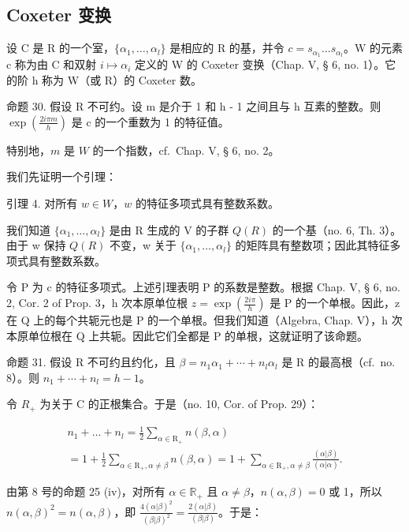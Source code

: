 \subsection{Coxeter 变换}

设 C 是 R 的一个室，\(\{\alpha_{1},\ldots,\alpha_{l}\}\) 是相应的 R 的基，并令 \(c=s_{\alpha_{1}}\ldots s_{\alpha_{l}}\)。W 的元素 c 称为由 C 和双射 \(i\mapsto\alpha_{i}\) 定义的 W 的 Coxeter 变换（Chap. V, § 6, no. 1）。它的阶 h 称为 W（或 R）的 Coxeter 数。

命题 30. 假设 R 不可约。设 m 是介于 1 和 h - 1 之间且与 h 互素的整数。则 \(\exp\left(\frac{2i\pi m}{h}\right)\) 是 c 的一个重数为 1 的特征值。

特别地，\(m\) 是 \(W\) 的一个指数，cf.~Chap. V, § 6, no. 2。

我们先证明一个引理：

引理 4. 对所有 \(w \in W\)，\(w\) 的特征多项式具有整数系数。

我们知道 \(\{\alpha_{1},\ldots,\alpha_{l}\}\) 是由 R 生成的 V 的子群 \(Q(R)\) 的一个基（no. 6, Th. 3）。由于 w 保持 \(Q(R)\) 不变，w 关于 \(\{\alpha_{1},\ldots,\alpha_{l}\}\) 的矩阵具有整数项；因此其特征多项式具有整数系数。

令 P 为 c 的特征多项式。上述引理表明 P 的系数是整数。根据 Chap. V, § 6, no. 2, Cor. 2 of Prop. 3，h 次本原单位根 \(z = \exp\left(\frac{2i\pi}{h}\right)\) 是 P 的一个单根。因此，z 在 Q 上的每个共轭元也是 P 的一个单根。但我们知道（Algebra, Chap. V），h 次本原单位根在 Q 上共轭。因此它们全都是 P 的单根，这就证明了该命题。

命题 31. 假设 R 不可约且约化，且 \(\beta = n_{1}\alpha_{1} + \cdots + n_{l}\alpha_{l}\) 是 R 的最高根（cf.~no. 8）。则 \(n_{1} + \cdots + n_{l} = h - 1\)。

令 \(R_{+}\) 为关于 C 的正根集合。于是（no. 10, Cor. of Prop. 29）：

\[
\begin{array}{l} n _ {1} + \dots + n _ {l} = \frac {1}{2} \sum_ {\alpha \in \mathrm{R} _ {+}} n (\beta , \alpha) \\ = 1 + \frac {1}{2} \sum_ {\alpha \in \mathrm{R} _ {+}, \alpha \neq \beta} n (\beta , \alpha) = 1 + \sum_ {\alpha \in \mathrm{R} _ {+}, \alpha \neq \beta} \frac {(\alpha | \beta)}{(\alpha | \alpha)}. \end{array}
\]

由第 8 号的命题 25 (iv)，对所有 \(\alpha \in \mathbb{R}_+\) 且 \(\alpha \neq \beta\)，\(n(\alpha, \beta) = 0\) 或 1，所以 \(n(\alpha, \beta)^2 = n(\alpha, \beta)\)，即 \(\frac{4(\alpha | \beta)^2}{(\beta | \beta)^2} = \frac{2(\alpha | \beta)}{(\beta | \beta)}\)。于是：

